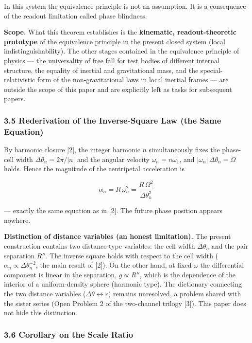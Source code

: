 \documentclass[
  a4paper,
]{article}
\begin{document}
In this system the equivalence principle is not an assumption. It is a
consequence of the readout limitation called phase blindness.

\textbf{Scope.} What this theorem establishes is the \textbf{kinematic,
readout-theoretic prototype} of the equivalence principle in the present
closed system (local indistinguishability). The other stages contained
in the equivalence principle of physics --- the universality of free
fall for test bodies of different internal structure, the equality of
inertial and gravitational mass, and the special-relativistic form of
the non-gravitational laws in local inertial frames --- are outside the
scope of this paper and are explicitly left as tasks for subsequent
papers.

\subsubsection{3.5 Rederivation of the Inverse-Square Law (the Same
Equation)}\label{rederivation-of-the-inverse-square-law-the-same-equation}

By harmonic closure {[}2{]}, the integer harmonic \(n\) simultaneously
fixes the phase-cell width \(\Delta\theta_n=2\pi/|n|\) and the angular
velocity \(\omega_n=n\omega_1\), and
\(|\omega_n|\,\Delta\theta_n=\Omega\) holds. Hence the magnitude of the
centripetal acceleration is

\[
\alpha_n=R\,\omega_n^2=\frac{R\,\Omega^2}{\Delta\theta_n^2}
\]

--- exactly the same equation as in {[}2{]}. The future phase position
appears nowhere.

\textbf{Distinction of distance variables (an honest limitation).} The
present construction contains two distance-type variables: the cell
width \(\Delta\theta_n\) and the pair separation \(R''\). The inverse
square holds with respect to the cell width
(\(\alpha_n\propto\Delta\theta_n^{-2}\), the main result of {[}2{]}). On
the other hand, at fixed \(\omega\) the differential component is linear
in the separation, \(g\propto R''\), which is the dependence of the
interior of a uniform-density sphere (harmonic type). The dictionary
connecting the two distance variables
(\(\Delta\theta\leftrightarrow r\)) remains unresolved, a problem shared
with the sister series (Open Problem 2 of the two-channel trilogy
{[}3{]}). This paper does not hide this distinction.

\subsubsection{3.6 Corollary on the Scale
Ratio}\label{corollary-on-the-scale-ratio}
\end{document}
